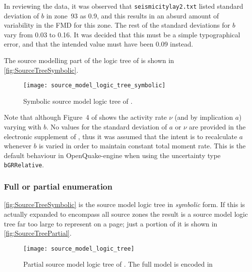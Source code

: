 \documentclass{article}
\begin{document}
In reviewing the data, it was observed that \texttt{seismicitylay2.txt} listed standard deviation of $b$ in zone~93 as 0.9, and this results in an absurd amount of variability in the FMD for this zone. The rest of the standard deviations for $b$ vary from 0.03 to 0.16. It was decided that this must be a simple typographical error, and that the intended value must have been 0.09 instead. 

The source modelling part of the logic tree of \citet[Figure~4]{nath2012probabilistic} is shown in \autoref{fig:SourceTreeSymbolic}. 

\begin{figure}
\begin{adjustbox}{center}
\texttt{[image: source\_model\_logic\_tree\_symbolic]}
\end{adjustbox}
\caption[Symbolic source model logic tree]{Symbolic source model logic tree of \cite{nath2012probabilistic}.}
\label{fig:SourceTreeSymbolic}
\end{figure}

Note that although Figure~4 of \cite{nath2012probabilistic} shows the activity rate $\nu$ (and by implication $a$) varying with $b$. No values for the standard deviation of $a$ or $\nu$ are provided in the electronic supplement of \cite{thingbaijam2011seismogenic}, thus it was assumed that the intent is to recalculate $a$ whenever $b$ is varied in order to maintain constant total moment rate.
This is the default behaviour in OpenQuake-engine when using the uncertainty type \texttt{bGRRelative}.

\subsubsection{Full or partial enumeration}
\label{subsubsec:Enumeration}

\autoref{fig:SourceTreeSymbolic} is the source model logic tree in \textit{symbolic} form.
If this is actually expanded to encompass all source zones the result is a source model logic tree far too large to represent on a page; just a portion of it is shown in \autoref{fig:SourceTreePartial}.

\begin{figure}
\begin{adjustbox}{center}
\texttt{[image: source\_model\_logic\_tree]}
\end{adjustbox}
\caption[Partial source model logic tree]{Partial source model logic tree of \cite{nath2012probabilistic}.
The full model is encoded in \texttt{}}
\label{fig:SourceTreePartial}
\end{figure}
\end{document}

